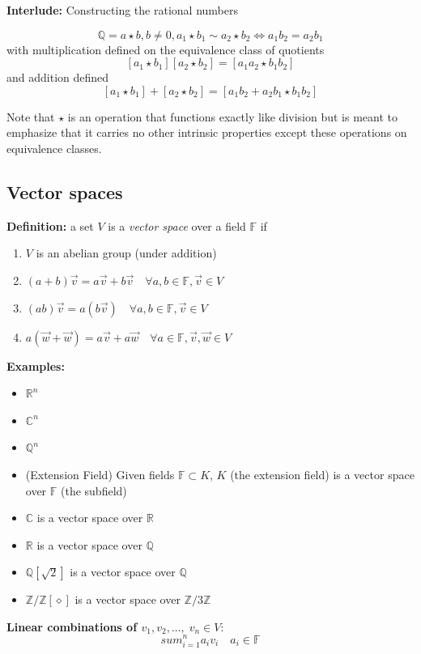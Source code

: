 \documentclass[12pt]{report}
\newcommand{\R}{\mathbb{R}}
\newcommand{\Z}{\mathbb{Z}}
\newcommand{\Q}{\mathbb{Q}}
\begin{document}
\textbf{Interlude:} Constructing the rational numbers 

\[\mathbb{Q} = a \star b , b \neq 0, a_1 \star b_1 \sim a_2 \star b_2 \iff a_1b_2 = a_2b_1\]
with multiplication defined on the equivalence class of quotients 
\[[a_1 \star b_1] [a_2 \star b_2] = [a_1a_2 \star b_1 b_2]\]
and addition defined  
\[[a_1 \star b_1] + [a_2 \star b_2] = [a_1b_2 + a_2b_1 \star b_1 b_2]\]

Note that $\star$ is an operation that functions exactly like division but is meant to emphasize that it carries no other intrinsic properties except these operations on equivalence classes. 

\subsection*{Vector spaces}
\textbf{Definition:} a set $V$ is a \emph{vector space} over a field $\mathbb{F}$ if 
\begin{enumerate}
    \item $V$ is an abelian group (under addition)
    \item $(a+ b) \vec v = a\vec v + b\vec v \quad \forall a,b \in \mathbb{F}, \vec v \in V$
    \item $(ab) \vec v = a(b\vec v) \quad \forall a, b \in \mathbb{F}, \vec v\in V$
    \item $a(\vec w + \vec w) = a\vec v + a \vec w \quad \forall a \in \mathbb{F}, \vec v, \vec w \in V$
\end{enumerate}

\textbf{Examples:} 
\begin{itemize}
    \item $\R^n$
    \item $\mathbb{C}^n$
    \item $\mathbb{Q}^n$
    \item (Extension Field) Given fields $\mathbb{F} \subset K$, $K$ (the extension field) is a vector space over $\mathbb{F}$ (the subfield)
    \item $\mathbb{C}$ is a vector space over $\R$ 
    \item $\R$ is a vector space over $\mathbb{Q}$
    \item $\Q[\sqrt 2]$  is a vector space over $\Q$
    \item $\Z/\Z[\diamond]$ is a vector space over $\Z/3\Z$
\end{itemize}

\textbf{Linear combinations of $v_1, v_2, \dots, \; v_n \in V$}:
\[sum_{i=1}^n a_i v_i \quad a_i \in \mathbb{F}\]
\end{document}
